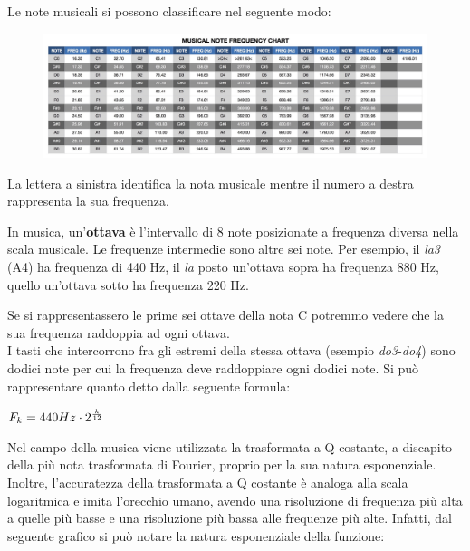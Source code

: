 Le note musicali si possono classificare nel seguente modo:
\begin{figure}[H]
	\centering
	\includegraphics[scale=0.15]{./images/img4.jpg}
\end{figure}
La lettera a sinistra identifica la nota musicale mentre il numero a destra rappresenta la sua frequenza.

In musica, un'\textbf{ottava} è l'intervallo di 8 note posizionate a frequenza diversa nella scala musicale. Le frequenze intermedie sono altre sei note. Per esempio, il \textit{la3} (A4) ha frequenza di 440 Hz, il \textit{la} posto un'ottava sopra ha frequenza 880 Hz, quello un'ottava sotto ha frequenza 220 Hz.

Se si rappresentassero le prime sei ottave della nota C potremmo vedere che la sua frequenza raddoppia ad ogni ottava. \\
\newline
I tasti che intercorrono fra gli estremi della stessa ottava (esempio \textit{do3}-\textit{do4}) sono dodici note per cui la frequenza deve raddoppiare ogni dodici note. Si può rappresentare quanto detto dalla seguente formula: \\

\begin{center}
	\begin{math}
		F_{k}=440Hz \cdot 2^{k \over 12}
	\end{math}
\end{center}
Nel campo della musica viene utilizzata la trasformata a Q costante, a discapito della più nota trasformata di Fourier, proprio per la sua natura esponenziale. Inoltre, l'accuratezza della trasformata a Q costante è analoga alla scala logaritmica e imita l'orecchio umano, avendo una risoluzione di frequenza più alta a quelle più basse e una risoluzione più bassa alle frequenze più alte. Infatti, dal seguente grafico si può notare la natura esponenziale della funzione:
\begin{center}
\end{center}